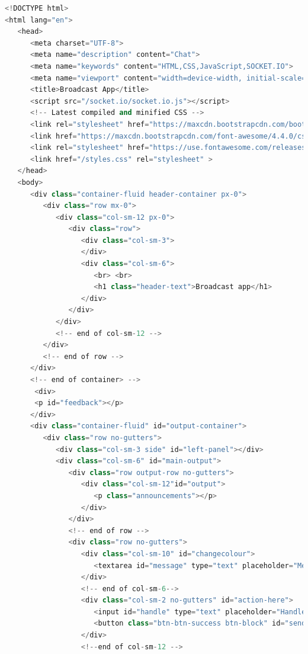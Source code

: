 \documentclass{fisatproject}
\begin{document}
\begin{appendices}
\begin{lstlisting}[language=c++]
<!DOCTYPE html>
<html lang="en">
   <head>
      <meta charset="UTF-8">
      <meta name="description" content="Chat">
      <meta name="keywords" content="HTML,CSS,JavaScript,SOCKET.IO">
      <meta name="viewport" content="width=device-width, initial-scale=1.0">
      <title>Broadcast App</title>
      <script src="/socket.io/socket.io.js"></script>
      <!-- Latest compiled and minified CSS -->
      <link rel="stylesheet" href="https://maxcdn.bootstrapcdn.com/bootstrap/4.0.0/css/bootstrap.min.css" integrity="sha384-Gn5384xqQ1aoWXA+058RXPxPg6fy4IWvTNh0E263XmFcJlSAwiGgFAW/dAiS6JXm" crossorigin="anonymous">
      <link href="https://maxcdn.bootstrapcdn.com/font-awesome/4.4.0/css/font-awesome.min.css" rel="stylesheet">
      <link rel="stylesheet" href="https://use.fontawesome.com/releases/v5.8.1/css/all.css" integrity="sha384-50oBUHEmvpQ+1lW4y57PTFmhCaXp0ML5d60M1M7uH2+nqUivzIebhndOJK28anvf" crossorigin="anonymous">
      <link href="/styles.css" rel="stylesheet" >
   </head>
   <body>
      <div class="container-fluid header-container px-0">
         <div class="row mx-0">
            <div class="col-sm-12 px-0">
               <div class="row">
                  <div class="col-sm-3">
                  </div>
                  <div class="col-sm-6">
                     <br> <br>
                     <h1 class="header-text">Broadcast app</h1>
                  </div>
               </div>
            </div>
            <!-- end of col-sm-12 -->
         </div>
         <!-- end of row -->
      </div>
      <!-- end of container> -->
       <div>
       <p id="feedback"></p>
      </div>
      <div class="container-fluid" id="output-container">
         <div class="row no-gutters">
            <div class="col-sm-3 side" id="left-panel"></div>
            <div class="col-sm-6" id="main-output">
               <div class="row output-row no-gutters">
                  <div class="col-sm-12"id="output">
                     <p class="announcements"></p>
                  </div>
               </div>
               <!-- end of row -->
               <div class="row no-gutters">
                  <div class="col-sm-10" id="changecolour">
                     <textarea id="message" type="text" placeholder="Message"></textarea>
                  </div>
                  <!-- end of col-sm-6-->
                  <div class="col-sm-2 no-gutters" id="action-here">
                     <input id="handle" type="text" placeholder="Handle" />
                     <button class="btn-btn-success btn-block" id="send">Send</button>
                  </div>
                  <!--end of col-sm-12 -->

\end{lstlisting}
\end{appendices}
\end{document}
